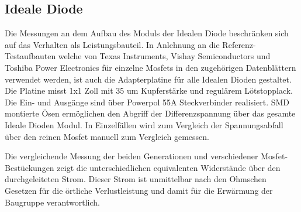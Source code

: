 \subsection{Ideale Diode}

Die Messungen an dem Aufbau des Moduls der Idealen Diode beschränken sich auf das Verhalten als Leistungsbauteil. 
In Anlehnung an die Referenz-Testaufbauten welche von Texas Instruments, Vishay Semiconductors und Toshiba Power Electronics für einzelne Mosfets in den zugehörigen Datenblättern verwendet werden, ist auch die Adapterplatine für alle Idealen Dioden gestaltet.
Die Platine misst 1x1 Zoll mit 35 um Kupferstärke und regulärem Lötstopplack. Die Ein- und Ausgänge sind über Powerpol 55A Steckverbinder realisiert. SMD montierte Ösen ermöglichen den Abgriff der Differenzspannung über das gesamte Ideale Dioden Modul. In Einzelfällen wird zum Vergleich der Spannungsabfall über den reinen Mosfet manuell zum Vergleich gemessen.

Die vergleichende Messung der beiden Generationen und verschiedener Mosfet-Bestückungen zeigt die unterschiedlichen equivalenten Widerstände über den durchgeleiteten Strom.
Dieser Strom ist unmittelbar nach den Ohmschen Gesetzen für die örtliche Verlustleistung und damit für die Erwärmung der Baugruppe verantwortlich.

